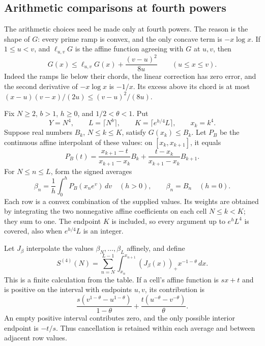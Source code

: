 \subsection{Arithmetic comparisons at fourth powers}
\label{rh-fourth-sampling}

The arithmetic choices need be made only at fourth powers. The reason
is the shape of $G$: every prime ramp is convex, and the only concave
term is $-x\log x$. If $1\le u<v$, and $\ell_{u,v}G$ is the affine
function agreeing with $G$ at $u,v$, then
\begin{equation}\label{rh-fourth-chord}
 G(x)\le\ell_{u,v}G(x)+\frac{(v-u)^2}{8u}
       \qquad(u\le x\le v).
\end{equation}
Indeed the ramps lie below their chords, the linear correction has
zero error, and the second derivative of $-x\log x$ is $-1/x$.
Its excess above its chord is at most
$(x-u)(v-x)/(2u)\le(v-u)^2/(8u)$.

Fix $N\ge2$, $b>1$, $h\ge0$, and $1/2<\theta<1$. Put
\[
 Y=N^4,\qquad L=\lceil N^b\rceil,\qquad
 K=\lceil e^{h/4}L\rceil,\qquad x_k=k^4.
\]
Suppose real numbers $B_k$, $N\le k\le K$, satisfy $G(x_k)\le B_k$.
Let $P_B$ be the continuous affine interpolant of these values: on
$[x_k,x_{k+1}]$, it equals
\[
 P_B(t)=\frac{x_{k+1}-t}{x_{k+1}-x_k}B_k
                  +\frac{t-x_k}{x_{k+1}-x_k}B_{k+1}.
\]
For $N\le n\le L$, form the signed averages
\begin{equation}\label{rh-fourth-rows}
 \beta_n=\frac1h\int_0^hP_B(x_ne^v)\,dv\quad(h>0),
 \qquad \beta_n=B_n\quad(h=0).
\end{equation}
Each row is a convex combination of the supplied values. Its weights
are obtained by integrating the two nonnegative affine coefficients
on each cell $N\le k<K$; they sum to one. The endpoint $K$ is included,
so every argument up to $e^hL^4$ is covered, also when $e^{h/4}L$
is an integer.

Let $J_\beta$ interpolate the values $\beta_N,\ldots,\beta_L$
affinely, and define
\begin{equation}\label{rh-fourth-cost}
 S^{(4)}(N)=\sum_{n=N}^{L-1}\int_{x_n}^{x_{n+1}}
                    (J_\beta(x))_+x^{-1-\theta}\,dx.
\end{equation}
This is a finite calculation from the table. If a cell's affine
function is $s x+t$ and is positive on the interval with endpoints
$u,v$, its contribution is
\[
 \frac{s(v^{1-\theta}-u^{1-\theta})}{1-\theta}
             +\frac{t(u^{-\theta}-v^{-\theta})}{\theta}.
\]
An empty positive interval contributes zero, and the only possible
interior endpoint is $-t/s$. Thus cancellation is retained within
each average and between adjacent row values.

